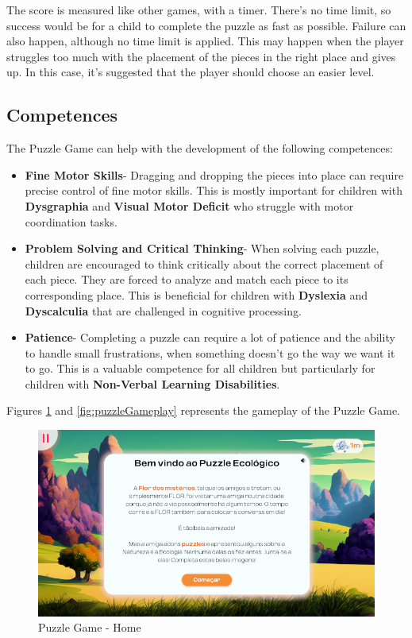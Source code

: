 The score is measured like other games, with a timer. There's no time limit, so success would be for a child to complete the puzzle as fast as possible. Failure can also happen, although no time limit is applied. This may happen when the player struggles too much with the placement of the pieces in the right place and gives up. In this case, it's suggested that the player should choose an easier level.

\subsection*{Competences}

The Puzzle Game can help with the development of the following competences:

\begin{itemize}
    \item \textbf{Fine Motor Skills}- Dragging and dropping the pieces into place can require precise control of fine motor skills. This is mostly important for children with \textbf{Dysgraphia} and \textbf{Visual Motor Deficit} who struggle with motor coordination tasks.

    \item \textbf{Problem Solving and Critical Thinking}- When solving each puzzle, children are encouraged to think critically about the correct placement of each piece. They are forced to analyze and match each piece to its corresponding place. This is beneficial for children with \textbf{Dyslexia} and \textbf{Dyscalculia} that are challenged in cognitive processing.
    
    \item \textbf{Patience}- Completing a puzzle can require a lot of patience and the ability to handle small frustrations, when something doesn't go the way we want it to go. This is a valuable competence for all children but particularly for children with \textbf{Non-Verbal Learning Disabilities}.
\end{itemize}

Figures \ref{fig:puzzleHome} and \ref{fig:puzzleGameplay} represents the gameplay of the Puzzle Game.

\begin{figure}[H]
    \centering
    \includegraphics[width=0.9\linewidth]{Chapters/gameplay/new_screens/puzzle_home.png}
    \caption{Puzzle Game - Home}
    \label{fig:puzzleHome}    
\end{figure}

